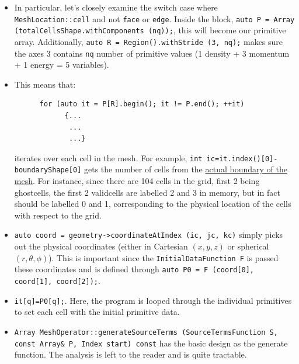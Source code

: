 \documentclass{article}
\begin{document}
\begin{itemize}
	\item In particular, let's closely examine the switch case where \texttt{MeshLocation::cell} and not \texttt{face} or \texttt{edge}. Inside the block, \texttt{auto P = Array (totalCellsShape.withComponents (nq));}, this will become our primitive array. Additionally, \texttt{auto R = Region().withStride (3, nq);} makes sure the axes 3 contains \texttt{nq} number of primitive values (1 density + 3 momentum + 1 energy = 5 variables). 
	
	\item This means that: 
	\begin{verbatim}
	  for (auto it = P[R].begin(); it != P.end(); ++it)
            {...
             ...
             ...} 	
	\end{verbatim}
	iterates over each cell in the mesh. For example, \texttt{int ic=it.index()[0]-boundaryShape[0]} gets the number of cells from the \underline{actual boundary of the mesh}. For instance, since there are 104 cells in the grid, first 2 being ghostcells, the first 2 validcells are labelled 2 and 3 in memory, but in fact should be labelled 0 and 1, corresponding to the physical location of the cells with respect to the grid.
	  
	\item \texttt{auto coord = geometry->coordinateAtIndex (ic, jc, kc)} simply picks out the physical coordinates (either in Cartesian $(x,y,z)$ or spherical $(r,\theta,\phi)$). This is important since the \texttt{InitialDataFunction F} is passed these coordinates and is defined through \texttt{auto P0 = F (coord[0], coord[1], coord[2]);}.
	
	\item \texttt{it[q]=P0[q];}. Here, the program is looped through the individual primitives to set each cell with the initial primitive data.
	
	\item \texttt{Array MeshOperator::generateSourceTerms (SourceTermsFunction S, const Array\& P, Index start) const} has the basic design as the generate function. The analysis is left to the reader and is quite tractable.
	
\end{itemize}
\end{document}
